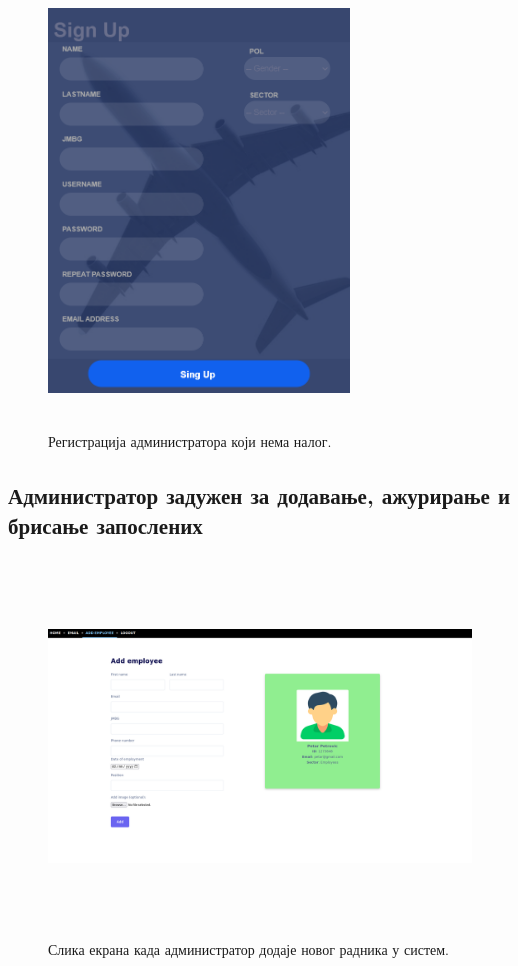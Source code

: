 \documentclass{article}
\begin{document}
\begin{figure}[H]
    \begin{center}
        \includegraphics[width=8cm, height=12cm]{Dizajn/signup.png}
        \caption{Регистрација администратора који нема налог.}
    \end{center}
\end{figure}

\subsection{Администратор задужен за додавање, ажурирање и брисање запослених}

\begin{figure}[H]
    \begin{center}
        \includegraphics[width=1.1\textwidth, height=10cm]{Dizajn/add_employee.png}
        \caption{Слика екрана када администратор додаје новог радника у систем.}
    \end{center}
\end{figure}
\end{document}
